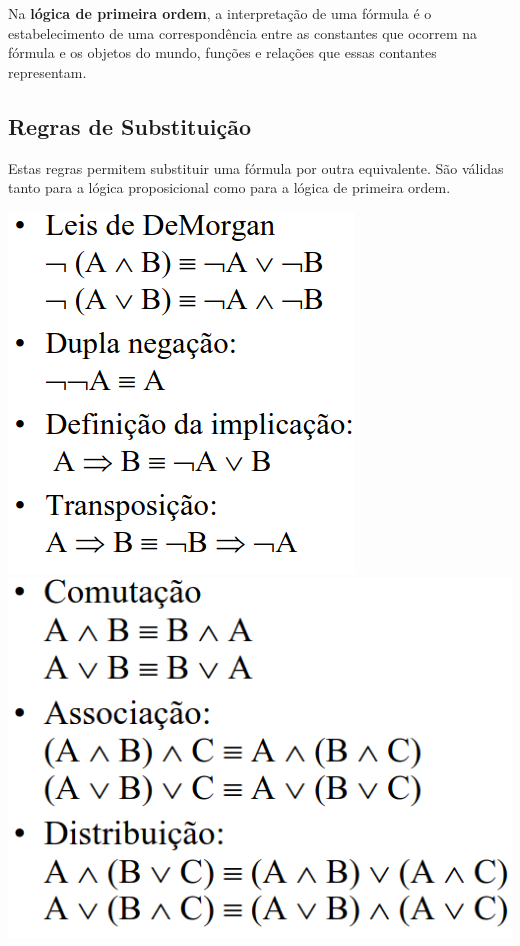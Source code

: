 \documentclass{article}
\begin{document}
Na \textbf{lógica de primeira ordem}, a interpretação de uma fórmula é o estabelecimento de uma
correspondência entre as constantes que ocorrem na fórmula e os objetos do mundo, funções e
relações que essas contantes representam.

\subsection{Regras de Substituição}

Estas regras permitem substituir uma fórmula por outra equivalente.
São válidas tanto para a lógica proposicional como para a lógica de primeira ordem.

\begin{center}
  \includegraphics[scale=0.35]{28}
  \includegraphics[scale=0.35]{29}
\end{center}
\end{document}
